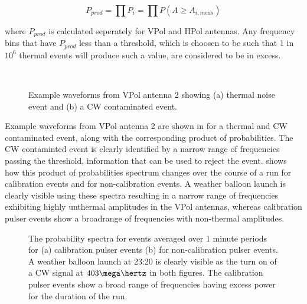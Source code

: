 \begin{equation}
  P_{prod} = \prod P_{i} = \prod P(A \geq A_{i, meas})
  \label{eq:Analysis:CWRemoval:Prod-Prob}
\end{equation}

\noindent where $P_{prod}$ is calculated seperately for VPol and HPol antennas. Any frequency bins that have $P_{prod}$ less than a threshold, which is choosen to be such that 1 in $10^{6}$ thermal events will produce such a value, are considered to be in excess. 


\begin{figure}[htpb]
  \hfill
  \\
  \hfill
  \caption{Example waveforms from VPol antenna 2 showing (a) thermal noise event and (b) a CW contaminated event.}
  \label{fig:analysis:CWRemoval:Baselines:Waveforms}
\end{figure}

Example waveforms from VPol antenna 2 are shown in  for a thermal and CW contaminated event, along with the corresponding product of probabilities. The CW contaminted event is clearly identified by a narrow range of frequencies passing the threshold, information that can be used to reject the event.  shows how this product of probabilities spectrum changes over the course of a run for calibration events and for non-calibration events. A weather balloon launch is clearly visible using these spectra resulting in a narrow range of frequencies exhibiting highly unthermal amplitudes in the VPol antennas, whereas calibration pulser events show a broadrange of frequencies with non-thermal amplitudes. 


\begin{figure}[htpb]
  \hfill
  \caption{The probability spectra for events averaged over 1 minute periods for (a) calibration pulser events (b) for non-calibration pulser events. A weather balloon launch at 23:20 is clearly visible as the turn on of a CW signal at $403 \mega \hertz$ in both figures. The calibration pulser events show a broad range of frequencies having excess power for the duration of the run.}
  \label{fig:analysis:CWRemoval:Filtering:CW-Time}
\end{figure}


